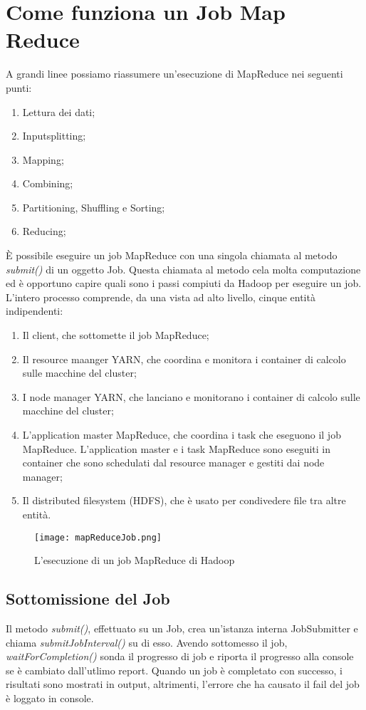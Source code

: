 \section{Come funziona un Job Map Reduce}
A grandi linee possiamo riassumere un'esecuzione di MapReduce nei seguenti punti:
\begin{enumerate}
  \item Lettura dei dati;
  \item Inputsplitting;
  \item Mapping;
  \item Combining; 
  \item Partitioning, Shuffling e Sorting;
  \item Reducing;
\end{enumerate}
È possibile eseguire un job MapReduce con una singola chiamata al metodo \textit{submit()} di un oggetto Job. Questa chiamata al metodo cela molta computazione ed è opportuno capire quali sono i passi compiuti da Hadoop  per eseguire un job. L'intero processo comprende, da una vista ad alto livello, cinque entità indipendenti:
\begin{enumerate}
  \item Il client, che sottomette il job MapReduce;
  \item Il resource maanger YARN, che coordina e monitora i container di calcolo sulle macchine del cluster;
  \item I node manager YARN, che lanciano e monitorano i container di calcolo sulle macchine del cluster;
  \item L'application master MapReduce, che coordina i task che eseguono il job MapReduce. L'application master e i task MapReduce sono eseguiti in container che sono schedulati dal resource manager e gestiti dai node manager;
  \item Il distributed filesystem (HDFS), che è usato per condivedere file tra altre entità.
\end{enumerate}
\begin{figure}
  \begin{center}
    \texttt{[image: mapReduceJob.png]}
    \caption{L'esecuzione di un job MapReduce di Hadoop}
    \label{fig:job}
  \end{center}
\end{figure}
\subsection{Sottomissione del Job}
Il metodo \textit{submit()}, effettuato su un Job, crea un'istanza interna JobSubmitter e chiama \textit{submitJobInterval()} su di esso. Avendo sottomesso il job, \textit{waitForCompletion()} sonda il progresso di job e riporta il progresso alla console se è cambiato dall'utlimo report. Quando un job è completato con successo, i risultati sono mostrati in output, altrimenti, l'errore che ha causato il fail del job è loggato in console.
